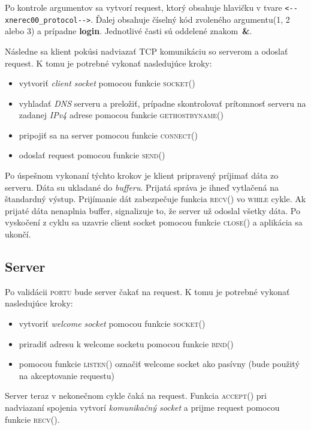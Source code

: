 \documentclass[a4paper, 11pt]{article}
\begin{document}
Po kontrole argumentov sa vytvorí request, ktorý obsahuje hlavičku v tvare \verb|<--xnerec00_protocol-->|. Ďalej obsahuje číselný kód zvoleného argumentu(1, 2 alebo 3) a prípadne \textbf{login}. Jednotlivé časti sú oddelené znakom~\textbf{\&}.

Následne sa klient pokúsi nadviazať TCP komunikáciu so serverom a odoslať request. K tomu je potrebné vykonať nasledujúce kroky:

\begin{itemize}
\item vytvoriť \emph{client socket} pomocou funkcie \textsc{socket()}
\item vyhladať \emph{DNS} serveru a preložiť, prípadne skontrolovať prítomnosť serveru na zadanej \emph{IPv4} adrese pomocou funkcie \textsc{gethostbyname()}
\item pripojiť sa na server pomocou funkcie \textsc{connect()}
\item odoslať request pomocou funkcie \textsc{send()}
\end{itemize}

Po úspešnom vykonaní týchto krokov je klient pripravený príjimať dáta zo serveru. Dáta su ukladané do \emph{bufferu}. Prijatá správa je ihneď vytlačená na štandardný výstup. Prijímanie dát zabezpečuje funkcia \textsc{recv()} vo \textsc{while} cykle. Ak prijaté dáta nenaplnia buffer, signalizuje to, že server už odoslal všetky dáta. Po vyskočení z cyklu sa uzavrie client socket pomocou funkcie \textsc{close()} a aplikácia sa ukončí.

\subsection{Server}
Po validácii \textsc{portu} bude server čakať na request. K tomu je potrebné vykonať nasledujúce kroky:

\begin{itemize}
	\item vytvoriť \emph{welcome socket} pomocou funkcie \textsc{socket()}
	\item priradiť adresu k welcome socketu pomocou funkcie \textsc{bind()}
	\item pomocou funkcie \textsc{listen()} označiť welcome socket ako pasívny (bude použitý na akceptovanie requestu)
\end{itemize}

Server teraz v nekonečnom cykle čaká na request. Funkcia \textsc{accept()} pri nadviazaní spojenia vytvorí \emph{komunikačný socket} a prijme request pomocou funkcie \textsc{recv()}.
\end{document}
